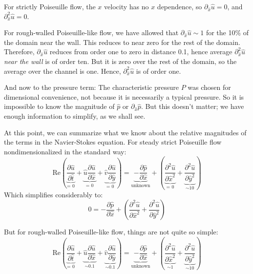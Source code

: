 \documentclass[a4paper]{report}
\begin{document}
For strictly Poiseuille flow, the $x$ velocity has no $x$ dependence, so $\partial_{\hat{x}} \hat{u} = 0 $, and $ \partial^2_{\hat{x}} \hat{u} = 0 $.

For rough-walled Poiseuille-like flow, we have allowed that $\partial_{\hat{x}} \hat{u} \sim 1$ for the 10\% of the domain near the wall.  This reduces to near zero for the rest of the domain.  Therefore, $\partial_{\hat{x}} \hat{u}$ reduces from order one to zero in distance 0.1, hence average $ \partial^2_{\hat{x}} \hat{u}$ \emph{near the wall} is of order ten.  But it is zero over the rest of the domain, so the average over the channel is one.  Hence, $ \partial^2_{\hat{x}} \hat{u}$ is of order one.

\vspace{1em}
And now to the pressure term:  The characteristic pressure $P$ was chosen for dimensional convenience, not because it is necessarily a typical pressure.  So it is impossible to know the magnitude of $\hat{p}$ or $\partial_{\hat{x}} \hat{p}$.  But this doesn't matter; we have enough information to simplify, as we shall see.

\vspace{1em}
At this point, we can summarize what we know about the relative magnitudes of the terms in the Navier-Stokes equation.  For steady strict Poiseuille flow nondimensionalized in the standard way:
\begin{equation}
\mathrm{Re} \left( 
\underbrace{ \frac{\partial \hat{u}}{\partial \hat{t}} }_{\text{= 0}} +
\underbrace{ \hat{u} \frac{\partial \hat{u}}{\partial \hat{x}} }_{\text{= 0}} +
\underbrace{ \hat{v} \frac{\partial \hat{u}}{\partial \hat{y}} }_{\text{= 0}} 
\right) = 
\underbrace{ - \frac{\partial \hat{p}}{\partial \hat{x}} }_{\text{unknown}}
  + \left( 
\underbrace{ \frac{\partial^2 \hat{u}}{\partial \hat{x}^2} }_{\text{= 0}} + 
\underbrace{ \frac{\partial^2 \hat{u}}{\partial \hat{y}^2} }_{\sim 10} 
\right)
\end{equation}
Which simplifies considerably to:
\begin{equation}
0 = -  \frac{\partial \hat{p}}{\partial \hat{x}} + 
\left( \frac{\partial^2 \hat{u}}{\partial \hat{x}^2} + 
\frac{\partial^2 \hat{u}}{\partial \hat{y}^2} \right)
\end{equation}

But for rough-walled Poiseuille-like flow, things are not quite so simple:
\begin{equation}
\mathrm{Re} \left( 
\underbrace{ \frac{\partial \hat{u}}{\partial \hat{t}} }_{\text{= 0}} +
\underbrace{ \hat{u} \frac{\partial \hat{u}}{\partial \hat{x}} }_{\sim 0.1} +
\underbrace{ \hat{v} \frac{\partial \hat{u}}{\partial \hat{y}} }_{\sim 0.1} 
\right) = 
\underbrace{ - \frac{\partial \hat{p}}{\partial \hat{x}} }_{\text{unknown}}
  + \left( 
\underbrace{ \frac{\partial^2 \hat{u}}{\partial \hat{x}^2} }_{\sim 1} + 
\underbrace{ \frac{\partial^2 \hat{u}}{\partial \hat{y}^2} }_{\sim 10} 
\right)
\end{equation}
\end{document}

